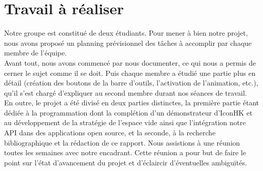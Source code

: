 \documentclass[12pt,a4paper]{article}
\newcommand\tab[1][0.65cm]{\hspace*{#1}}
\begin{document}
\section{Travail à réaliser}
Notre groupe est constitué de deux étudiants. Pour mener à bien notre projet, nous avons proposé un planning prévisionnel des tâches à accomplir par chaque membre de l’équipe.\\
\tab Avant tout, nous avons commencé par nous documenter, ce qui nous a permis de cerner le sujet comme il se doit. Puis chaque membre a étudié une partie plus en détail (création des boutons de la barre d’outils, l’activation de l’animation, etc.), qu’il s’est chargé d’expliquer au second membre durant nos séances de travail.\\
\tab En outre, le projet a été divisé en deux parties distinctes, la première partie étant dédiée à la programmation dont la complétion d'un démonstrateur d'IconHK et au développement de la stratégie de l'espace vide ainsi que l'intégration notre API dans des applications open source, et la seconde, à la recherche bibliographique et la rédaction de ce rapport. Nous assistions à une réunion toutes les semaines avec notre encadrant. Cette réunion a pour but de faire le point sur l’état d’avancement du projet et d’éclaircir d’éventuelles ambiguïtés.\\
\end{document}
